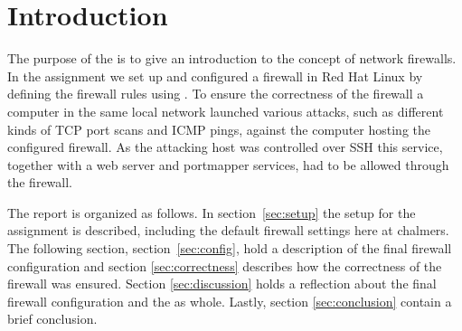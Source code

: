 \section{Introduction} 
\label{sec:intro}

The purpose of the \lab is to give an introduction to the concept of network firewalls. In the assignment we set up and configured a firewall in Red Hat Linux by defining the firewall rules using . To ensure the correctness of the firewall a computer in the same local network launched various attacks, such as different kinds of TCP port scans and ICMP pings, against the computer hosting the configured firewall. As the attacking host was controlled over SSH this service, together with a web server and portmapper services, had to be allowed through the firewall. 

The report is organized as follows. In section~\ref{sec:setup} the setup for the assignment is described, including the default firewall settings here at chalmers. The following section, section~\ref{sec:config}, hold a description of the final firewall configuration and section \ref{sec:correctness} describes how the correctness of the firewall was ensured. Section \ref{sec:discussion} holds a reflection about the final firewall configuration and the \lab as whole. Lastly, section \ref{sec:conclusion} contain a brief conclusion.